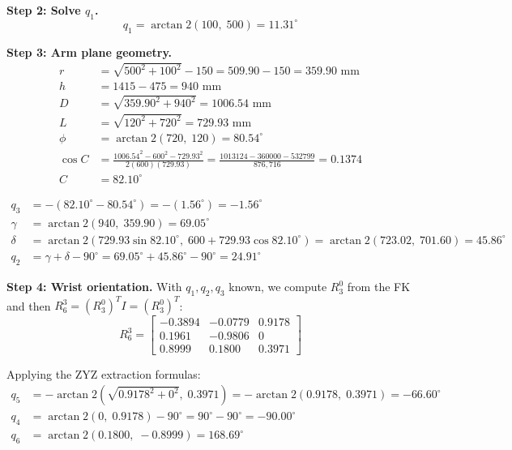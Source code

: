 \documentclass[12pt]{article}
\begin{document}
\textbf{Step 2: Solve $q_1$.}
\[
q_1 = \arctan 2(100,\;500) = 11.31^\circ
\]

\textbf{Step 3: Arm plane geometry.}
\begin{align*}
r   &= \sqrt{500^2+100^2} - 150 = 509.90 - 150 = 359.90\text{ mm}\\
h   &= 1415 - 475 = 940\text{ mm}\\
D   &= \sqrt{359.90^2+940^2} = 1006.54\text{ mm}\\
L   &= \sqrt{120^2+720^2} = 729.93\text{ mm}\\
\phi &= \arctan 2(720,\;120) = 80.54^\circ\\[4pt]
\cos C &= \frac{1006.54^2 - 600^2 - 729.93^2}{2(600)(729.93)}
        = \frac{1013124 - 360000 - 532799}{876{,}716}
        = 0.1374\\
C   &= 82.10^\circ
\end{align*}

\begin{align*}
q_3 &= -(82.10^\circ - 80.54^\circ) = -(1.56^\circ) = \mathbf{-1.56^\circ}\\[4pt]
\gamma &= \arctan 2(940,\;359.90) = 69.05^\circ\\
\delta &= \arctan 2(729.93\sin82.10^\circ,\;600+729.93\cos82.10^\circ)
        = \arctan 2(723.02,\;701.60) = 45.86^\circ\\
q_2 &= \gamma + \delta - 90^\circ = 69.05^\circ + 45.86^\circ - 90^\circ
      = \mathbf{24.91^\circ}
\end{align*}

\textbf{Step 4: Wrist orientation.}
With $q_1, q_2, q_3$ known, we compute $R_3^0$ from the FK and
then $R_6^3 = (R_3^0)^T I = (R_3^0)^T$:
\[
R_6^3 = \begin{bmatrix}
-0.3894 & -0.0779 &  0.9178 \\
 0.1961 & -0.9806 &  0      \\
 0.8999 &  0.1800 &  0.3971
\end{bmatrix}
\]

Applying the ZYZ extraction formulas:
\begin{align*}
q_5 &= -\arctan 2\!\left(\sqrt{0.9178^2+0^2},\;0.3971\right)
      = -\arctan 2(0.9178,\;0.3971) = \mathbf{-66.60^\circ}\\[4pt]
q_4 &= \arctan 2(0,\;0.9178) - 90^\circ
      = 90^\circ - 90^\circ = \mathbf{-90.00^\circ}\\[4pt]
q_6 &= \arctan 2(0.1800,\;-0.8999)
      = \mathbf{168.69^\circ}
\end{align*}
\end{document}
